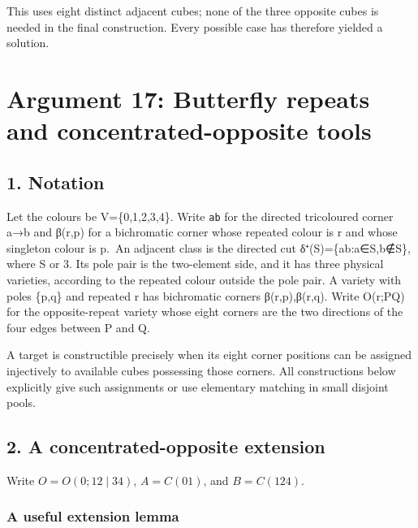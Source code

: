 \documentclass[
  10pt,
]{article}
\begin{document}
This uses eight distinct adjacent cubes; none of the three opposite
cubes is needed in the final construction. Every possible case has
therefore yielded a solution.

\hypertarget{arg-17}{%
\section{Argument 17: Butterfly repeats and concentrated-opposite
tools}\label{arg-17}}

\hypertarget{notation}{%
\subsection*{1. Notation}\label{notation}}

Let the colours be V=\{0,1,2,3,4\}. Write \texttt{ab} for the directed
tricoloured corner a→b and β(r,p) for a bichromatic corner whose
repeated colour is r and whose singleton colour is p.~An adjacent class
is the directed cut δ⁺(S)=\{ab:a∈S,b∉S\}, where \textbar S or
3. Its pole pair is the two-element side, and it has three physical
varieties, according to the repeated colour outside the pole pair. A
variety with poles \{p,q\} and repeated r has bichromatic corners
β(r,p),β(r,q). Write O(r;P\textbar Q) for the opposite-repeat variety
whose eight corners are the two directions of the four edges between P
and Q.

A target is constructible precisely when its eight corner positions can
be assigned injectively to available cubes possessing those corners. All
constructions below explicitly give such assignments or use elementary
matching in small disjoint pools.

\hypertarget{a-concentrated-opposite-extension}{%
\subsection*{2. A concentrated-opposite
extension}\label{a-concentrated-opposite-extension}}

Write \(O=O(0;12\mid34)\), \(A=C(01)\), and \(B=C(124)\).

\hypertarget{a-useful-extension-lemma}{%
\subsubsection*{A useful extension
lemma}\label{a-useful-extension-lemma}}
\end{document}
